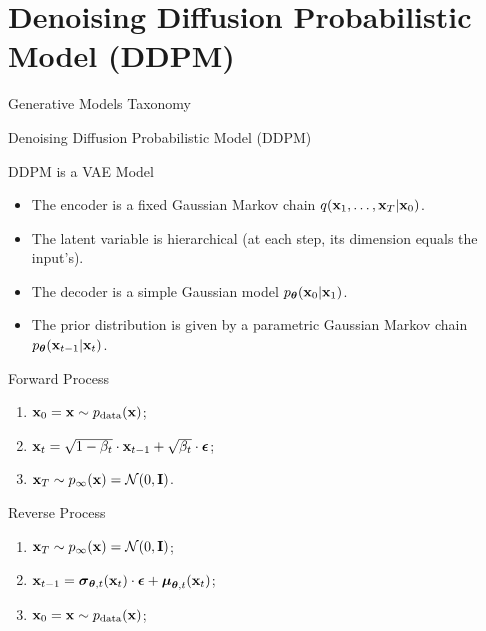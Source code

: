 \documentclass{beamer}
\renewcommand{\eqpause}{}
\begin{document}
\section{Denoising Diffusion Probabilistic Model (DDPM)}
\begin{frame}{Generative Models Taxonomy}
\end{frame}
\begin{frame}{Denoising Diffusion Probabilistic Model (DDPM)}
    \begin{block}{DDPM is a VAE Model}
        \begin{itemize}
            \item The encoder is a fixed Gaussian Markov chain $q(\mathbf{x}_1, \dots, \mathbf{x}_T | \mathbf{x}_0)$.
            \item The latent variable is hierarchical (at each step, its dimension equals the input's).
            \item The decoder is a simple Gaussian model $p_{\boldsymbol{\theta}}(\mathbf{x}_0 | \mathbf{x}_1)$.
            \item The prior distribution is given by a parametric Gaussian Markov chain $p_{\boldsymbol{\theta}}(\mathbf{x}_{t-1} | \mathbf{x}_t)$.
        \end{itemize}
    \end{block}
    \eqpause
    \begin{minipage}{0.5\linewidth}
        \begin{block}{Forward Process}
            \begin{enumerate}
                \item $\mathbf{x}_0 = \mathbf{x} \sim p_{\text{data}}(\mathbf{x})$;
                \item $\mathbf{x}_t = \sqrt{1 - \beta_t} \cdot \mathbf{x}_{t - 1} + \sqrt{\beta_t} \cdot \boldsymbol{\epsilon}$;
                \item $\mathbf{x}_T \sim p_{\infty}(\mathbf{x}) = \mathcal{N}(0, \mathbf{I})$.
            \end{enumerate}
        \end{block}
    \end{minipage}%
    \eqpause
    \begin{minipage}{0.55\linewidth}
        \begin{block}{Reverse Process}
            \begin{enumerate}
                \item $\mathbf{x}_T \sim p_{\infty}(\mathbf{x}) = \mathcal{N}(0, \mathbf{I})$;
                \item $\mathbf{x}_{t - 1} = \boldsymbol{\sigma}_{\boldsymbol{\theta}, t}(\mathbf{x}_t) \cdot \boldsymbol{\epsilon} + \boldsymbol{\mu}_{\boldsymbol{\theta}, t}(\mathbf{x}_t)$;
                \item $\mathbf{x}_0 = \mathbf{x} \sim p_{\text{data}}(\mathbf{x})$;
            \end{enumerate}
        \end{block}
    \end{minipage}
\end{frame}
\end{document}
